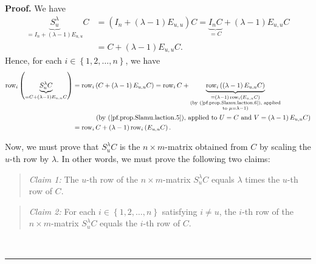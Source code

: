 \documentclass[numbers=enddot,12pt,final,onecolumn,notitlepage]{scrartcl}%
\theoremstyle{definition}
\newenvironment{statement}{\begin{quote}}{\end{quote}}
\newenvironment{proof}[1][Proof]{\noindent\textbf{#1.} }{\ \rule{0.5em}{0.5em}}
\begin{document}
\begin{proof}
We have%
\begin{align*}
\underbrace{S_{u}^{\lambda}}_{=I_{n}+\left(  \lambda-1\right)  E_{u,u}}C  &
=\left(  I_{n}+\left(  \lambda-1\right)  E_{u,u}\right)  C=\underbrace{I_{n}%
C}_{=C}+\left(  \lambda-1\right)  E_{u,u}C\\
&  =C+\left(  \lambda-1\right)  E_{u,u}C.
\end{align*}
Hence, for each $i\in\left\{  1,2,\ldots,n\right\}  $, we have%
\begin{align}
\operatorname*{row}\nolimits_{i}\left(  \underbrace{S_{u}^{\lambda}%
C}_{=C+\left(  \lambda-1\right)  E_{u,u}C}\right)   &  =\operatorname*{row}%
\nolimits_{i}\left(  C+\left(  \lambda-1\right)  E_{u,u}C\right)
=\operatorname*{row}\nolimits_{i}C+\underbrace{\operatorname*{row}%
\nolimits_{i}\left(  \left(  \lambda-1\right)  E_{u,u}C\right)  }%
_{\substack{=\left(  \lambda-1\right)  \operatorname*{row}\nolimits_{i}\left(
E_{u,u}C\right)  \\\text{(by (\ref{pf.prop.Slamu.laction.6}), applied}%
\\\text{to }\mu=\lambda-1\text{)}}}\nonumber\\
&  \ \ \ \ \ \ \ \ \ \ \left(  \text{by (\ref{pf.prop.Slamu.laction.5}),
applied to }U=C\text{ and }V=\left(  \lambda-1\right)  E_{u,u}C\right)
\nonumber\\
&  =\operatorname*{row}\nolimits_{i}C+\left(  \lambda-1\right)
\operatorname*{row}\nolimits_{i}\left(  E_{u,u}C\right)  .
\label{pf.prop.Slamu.laction.9}%
\end{align}


Now, we must prove that $S_{u}^{\lambda}C$ is the $n\times m$-matrix obtained
from $C$ by scaling the $u$-th row by $\lambda$. In other words, we must prove
the following two claims:

\begin{statement}
\textit{Claim 1:} The $u$-th row of the $n\times m$-matrix $S_{u}^{\lambda}C$
equals $\lambda$ times the $u$-th row of $C$.
\end{statement}

\begin{statement}
\textit{Claim 2:} For each $i\in\left\{  1,2,\ldots,n\right\}  $ satisfying
$i\neq u$, the $i$-th row of the $n\times m$-matrix $S_{u}^{\lambda}C$ equals
the $i$-th row of $C$.
\end{statement}


\end{proof}
\end{document}
